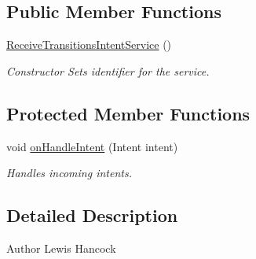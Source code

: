 \subsection*{Public Member Functions}
\begin{DoxyCompactItemize}
\item 
\hyperlink{classuk_1_1ac_1_1swan_1_1digitaltrails_1_1utils_1_1_receive_transitions_intent_service_a3f8c82bfe917566a8545bd7dd693945d}{Receive\+Transitions\+Intent\+Service} ()
\begin{DoxyCompactList}\small\item\em Constructor Sets identifier for the service. \end{DoxyCompactList}\end{DoxyCompactItemize}
\subsection*{Protected Member Functions}
\begin{DoxyCompactItemize}
\item 
void \hyperlink{classuk_1_1ac_1_1swan_1_1digitaltrails_1_1utils_1_1_receive_transitions_intent_service_a3cd694363233cd8a49028cbc46bf0800}{on\+Handle\+Intent} (Intent intent)
\begin{DoxyCompactList}\small\item\em Handles incoming intents. \end{DoxyCompactList}\end{DoxyCompactItemize}


\subsection{Detailed Description}
\begin{DoxyAuthor}{Author}
Lewis Hancock 
\end{DoxyAuthor}


